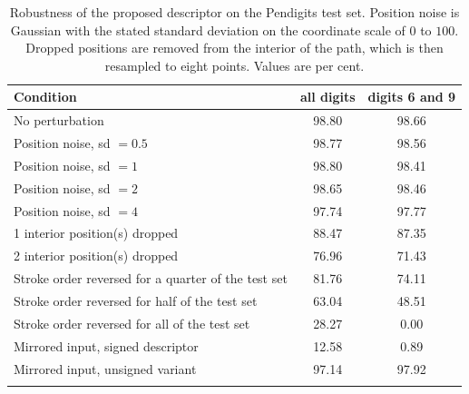 \begin{table}[t]
\caption{Robustness of the proposed descriptor on the Pendigits test set.
Position noise is Gaussian with the stated standard deviation on the coordinate
scale of $0$ to $100$. Dropped positions are removed from the interior of the
path, which is then resampled to eight points. Values are per cent.}
\label{tab:robust}
\begin{tabular}{lcc}
\toprule
Condition & all digits & digits 6 and 9\\
\midrule
No perturbation & 98.80 & 98.66\\
Position noise, sd $=0.5$ & 98.77 & 98.56\\
Position noise, sd $=1$ & 98.80 & 98.41\\
Position noise, sd $=2$ & 98.65 & 98.46\\
Position noise, sd $=4$ & 97.74 & 97.77\\
1 interior position(s) dropped & 88.47 & 87.35\\
2 interior position(s) dropped & 76.96 & 71.43\\
Stroke order reversed for a quarter of the test set & 81.76 & 74.11\\
Stroke order reversed for half of the test set & 63.04 & 48.51\\
Stroke order reversed for all of the test set & 28.27 & 0.00\\
Mirrored input, signed descriptor & 12.58 & 0.89\\
Mirrored input, unsigned variant & 97.14 & 97.92\\
\botrule
\end{tabular}
\end{table}
